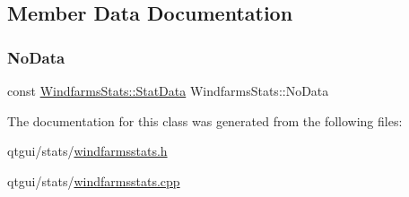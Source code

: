 \subsection{Member Data Documentation}
\mbox{\label{class_windfarms_stats_a89b5430d0020bb2677aa2097ac2edd5d}} 
\subsubsection{\texorpdfstring{NoData}{NoData}}
{\footnotesize\ttfamily const \mbox{\hyperlink{struct_windfarms_stats_1_1_stat_data}{Windfarms\+Stats\+::\+Stat\+Data}} Windfarms\+Stats\+::\+No\+Data\hspace{0.3cm}{\ttfamily [static]}}



The documentation for this class was generated from the following files\+:\begin{DoxyCompactItemize}
\item 
qtgui/stats/\mbox{\hyperlink{windfarmsstats_8h}{windfarmsstats.\+h}}\item 
qtgui/stats/\mbox{\hyperlink{windfarmsstats_8cpp}{windfarmsstats.\+cpp}}\end{DoxyCompactItemize}
